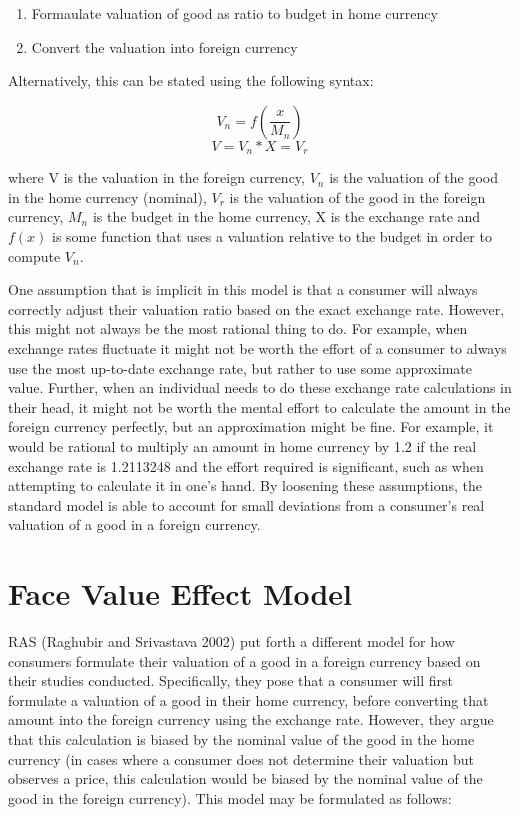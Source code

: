 \documentclass[
]{report}
\providecommand{\tightlist}{%
  \setlength{\itemsep}{0pt}\setlength{\parskip}{0pt}}\usepackage{longtable,booktabs,array}
\begin{document}
\begin{enumerate}
\def\labelenumi{\arabic{enumi}.}
\tightlist
\item
  Formaulate valuation of good as ratio to budget in home currency
\item
  Convert the valuation into foreign currency
\end{enumerate}

Alternatively, this can be stated using the following syntax:

\[V_n = f(\dfrac{x}{M_n})\] \[V = V_n * X = V_r\]

where V is the valuation in the foreign currency, \(V_n\) is the
valuation of the good in the home currency (nominal), \(V_r\) is the
valuation of the good in the foreign currency, \(M_n\) is the budget in
the home currency, X is the exchange rate and \(f(x)\) is some function
that uses a valuation relative to the budget in order to compute
\(V_n\).

One assumption that is implicit in this model is that a consumer will
always correctly adjust their valuation ratio based on the exact
exchange rate. However, this might not always be the most rational thing
to do. For example, when exchange rates fluctuate it might not be worth
the effort of a consumer to always use the most up-to-date exchange
rate, but rather to use some approximate value. Further, when an
individual needs to do these exchange rate calculations in their head,
it might not be worth the mental effort to calculate the amount in the
foreign currency perfectly, but an approximation might be fine. For
example, it would be rational to multiply an amount in home currency by
1.2 if the real exchange rate is 1.2113248 and the effort required is
significant, such as when attempting to calculate it in one's hand. By
loosening these assumptions, the standard model is able to account for
small deviations from a consumer's real valuation of a good in a foreign
currency.

\section{Face Value Effect Model}\label{face-value-effect-model}

RAS (Raghubir and Srivastava 2002) put forth a different model for how
consumers formulate their valuation of a good in a foreign currency
based on their studies conducted. Specifically, they pose that a
consumer will first formulate a valuation of a good in their home
currency, before converting that amount into the foreign currency using
the exchange rate. However, they argue that this calculation is biased
by the nominal value of the good in the home currency (in cases where a
consumer does not determine their valuation but observes a price, this
calculation would be biased by the nominal value of the good in the
foreign currency). This model may be formulated as follows:
\end{document}

